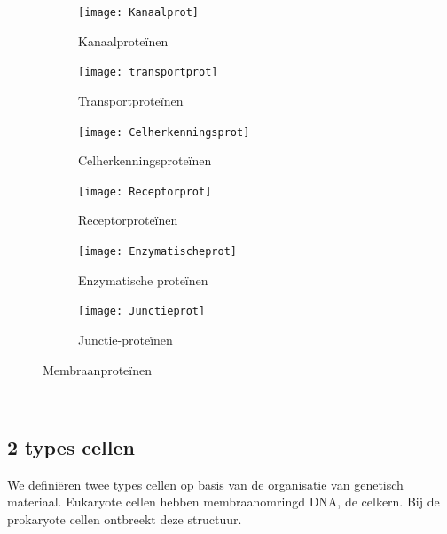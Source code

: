 \documentclass[a4paper,kul]{kulakarticle} %
\begin{document}
\begin{figure}[!htbp]
	\centering
	\begin{subfigure}{.5\textwidth}
		\centering
		\texttt{[image: Kanaalprot]}
		\caption{Kanaalproteïnen}
		\label{fig:kanaal}
	\end{subfigure}%
	\begin{subfigure}{.5\textwidth}
		\centering
		\texttt{[image: transportprot]}
		\caption{Transportproteïnen}
		\label{fig:transport}
	\end{subfigure}
\medskip
	\begin{subfigure}{.5\textwidth}
		\centering
		\texttt{[image: Celherkenningsprot]}
		\caption{Celherkenningsproteïnen}
		\label{fig:Celherkenningsproteïnen}
	\end{subfigure}%
	\begin{subfigure}{.5\textwidth}
		\centering
		\texttt{[image: Receptorprot]}
		\caption{Receptorproteïnen}
		\label{fig:Receptorproteïnen}
	\end{subfigure}
\medskip
	\begin{subfigure}{.5\textwidth}
		\centering
		\texttt{[image: Enzymatischeprot]}
		\caption{Enzymatische proteïnen}
		\label{fig:Enzymproteïnen}
	\end{subfigure}%
	\begin{subfigure}{.5\textwidth}
		\centering
		\texttt{[image: Junctieprot]}
		\caption{Junctie-proteïnen}
		\label{fig:Junctieproteïnen}
	\end{subfigure}
	\caption{Membraanproteïnen}
	\label{fig:membraanprot}
\end{figure}\\
\newpage
\subsection{2 types cellen}
We definiëren twee types cellen op basis van de organisatie van genetisch materiaal. Eukaryote cellen hebben membraanomringd DNA, de celkern. Bij de prokaryote cellen ontbreekt deze structuur.  
\end{document}
